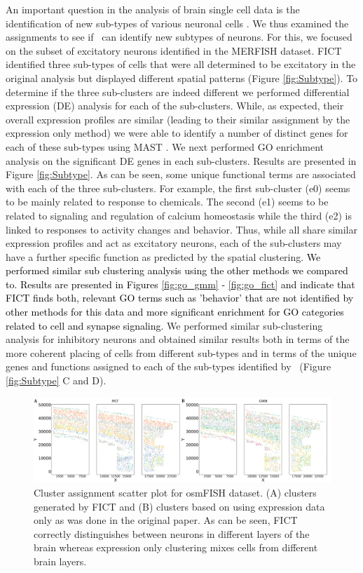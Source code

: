 An important question in the analysis of brain single cell data is the identification of new sub-types of various neuronal cells \cite{lake2016neuronal}. We thus examined the assignments to see if \fict\ can identify new subtypes of neurons. For this, we focused on the subset of excitatory neurons identified in the MERFISH dataset. FICT identified three sub-types of cells that were all determined to be excitatory in the original analysis but displayed different spatial patterns (Figure \ref{fig:Subtype}). To determine if the three sub-clusters are indeed different we performed differential expression (DE) analysis for each of the sub-clusters. While, as expected, their overall expression profiles are similar (leading to their similar assignment by the expression only method) we were able to identify a number of distinct genes for each of these sub-types using MAST \cite{finak2015mast}. We next performed GO enrichment analysis  \cite{ashburner2000gene,gene2019gene,mi2017panther} on the significant DE genes in each sub-clusters. Results are presented in Figure \ref{fig:Subtype}. As can be seen, some unique functional terms are associated with each of the three sub-clusters. For example, the first sub-cluster (e0) seems to be mainly related to response to chemicals. The second (e1) seems to be related to signaling and regulation of calcium homeostasis while the third (e2) is linked to responses to activity changes and behavior. Thus, while all share similar expression profiles and act as excitatory neurons, each of the sub-clusters may have a further specific function as predicted by the spatial clustering. \textcolor{black}{We performed similar sub clustering analysis using the other methods we compared to. Results are presented in Figures \ref{fig:go_gmm} - \ref{fig:go_fict} and indicate that FICT finds both, relevant GO terms such as 'behavior' that are not identified by other methods for this data and more significant enrichment for GO categories related to cell and synapse signaling.}
We performed similar sub-clustering analysis for inhibitory neurons and obtained similar results both in terms of the more coherent placing of cells from different sub-types and in terms of the unique genes and functions assigned to each of the sub-types identified by \fict\ (Figure \ref{fig:Subtype} C and D).

\begin{figure}
    \includegraphics[width=\textwidth]{figs/osmFISH_scatter.png}
    \caption{Cluster assignment scatter plot for osmFISH dataset. (A) clusters generated  by FICT and (B)  clusters based on using expression data only as was done in the original paper. As can be seen, FICT correctly distinguishes between neurons in different layers of the brain whereas expression only clustering mixes cells from different brain layers.}
    \label{fig:osmFISH}
\end{figure}
